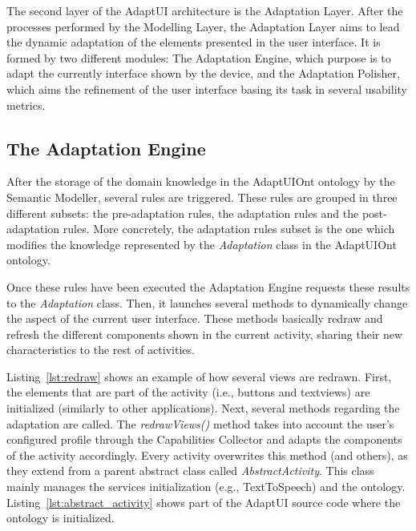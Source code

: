 The second layer of the AdaptUI architecture is the Adaptation Layer. After the
processes performed by the Modelling Layer, the Adaptation Layer aims to lead the
dynamic adaptation of the elements presented in the user interface. It is formed
by two different modules: The Adaptation Engine, which purpose is to adapt the
currently interface shown by the device, and the Adaptation Polisher, which aims
the refinement of the user interface basing its task in several usability metrics.


\subsection{The Adaptation Engine}
\label{sec:adaptation_engine}

After the storage of the domain knowledge in the AdaptUIOnt ontology by the
Semantic Modeller, several rules are triggered. These rules are grouped in three
different subsets: the pre-adaptation rules, the adaptation rules and the post-adaptation
rules. More concretely, the adaptation rules subset is the one which modifies
the knowledge represented by the \textit{Adaptation} class in the AdaptUIOnt
ontology.

Once these rules have been executed the Adaptation Engine requests these results
to the \textit{Adaptation} class. Then, it launches several methods to dynamically
change the aspect of the current user interface. These methods basically redraw
and refresh the different components shown in the current activity, sharing
their new characteristics to the rest of activities. 

Listing~\ref{lst:redraw} shows an example of how several views are redrawn.
First, the elements that are part of the activity (i.e., buttons and textviews)
are initialized (similarly to other applications). Next, several methods regarding
the adaptation are called. The \textit{redrawViews()} method takes into account
the user's configured profile through the Capabilities Collector and adapts the
components of the activity accordingly. Every activity overwrites this method
(and others), as they extend from a parent abstract class called
\textit{AbstractActivity}. This class mainly manages the services initialization
(e.g., TextToSpeech) and the ontology. Listing~\ref{lst:abstract_activity} shows
part of the AdaptUI source code where the ontology is initialized.


\inputminted[linenos=true, fontsize=\footnotesize, frame=lines]{java}{4_system_architecture/redraw.java}

